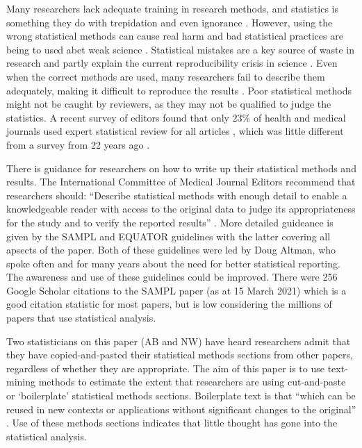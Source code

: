 \documentclass[12pt]{article}
\begin{document}
Many researchers lack adequate training in research methods, and
statistics is something they do with trepidation and even ignorance
\citep{Altman1994, King2019}. However, using the wrong statistical
methods can cause real harm \citep{Altman1994, Brown2018} and bad
statistical practices are being to used abet weak science
\citep{Stark2018}. Statistical mistakes are a key source of waste in
research and partly explain the current reproducibility crisis in
science \citep{Allison2016}. Even when the correct methods are used,
many researchers fail to describe them adequately, making it difficult
to reproduce the results \citep{Ernst2017, Zhou2018}. Poor statistical
methods might not be caught by reviewers, as they may not be qualified
to judge the statistics. A recent survey of editors found that only 23\%
of health and medical journals used expert statistical review for all
articles \citep{Hardwicke2020}, which was little different from a survey
from 22 years ago \citep{Goodman1998}.

There is guidance for researchers on how to write up their statistical
methods and results. The International Committee of Medical Journal
Editors recommend that researchers should: ``Describe statistical
methods with enough detail to enable a knowledgeable reader with access
to the original data to judge its appropriateness for the study and to
verify the reported results'' \citep{ICMJE2019}. More detailed guideance
is given by the SAMPL and EQUATOR guidelines
\citep{Lang2013, Altman2016} with the latter covering all apsects of the
paper. Both of these guidelines were led by Doug Altman, who spoke often
and for many years about the need for better statistical reporting. The
awareness and use of these guidelines could be improved. There were 256
Google Scholar citations to the SAMPL paper (as at 15 March 2021) which
is a good citation statistic for most papers, but is low considering the
millions of papers that use statistical analysis.

Two statisticians on this paper (AB and NW) have heard researchers admit
that they have copied-and-pasted their statistical methods sections from
other papers, regardless of whether they are appropriate. The aim of
this paper is to use text-mining methods to estimate the extent that
researchers are using cut-and-paste or `boilerplate' statistical methods
sections. Boilerplate text is that ``which can be reused in new contexts
or applications without significant changes to the original''
\citep{Wikipedia}. Use of these methods sections indicates that little
thought has gone into the statistical analysis.
\end{document}
